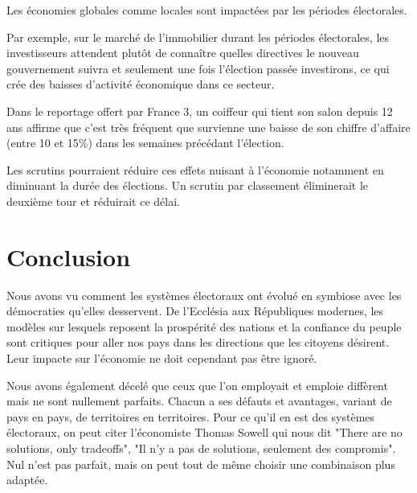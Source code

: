 \documentclass[11pt,a4paper]{report}
\begin{document}
Les économies globales comme locales sont impactées par les périodes électorales.

Par exemple, sur le marché de l’immobilier durant les périodes électorales, les investisseurs attendent plutôt de connaître quelles directives le nouveau gouvernement suivra et seulement une fois l'élection passée investirons, ce qui crée des baisses d’activité économique dans ce secteur.

Dans le reportage offert par France 3\nocite{fr3:impact}, un coiffeur qui tient son salon depuis 12 ans affirme que c’est très fréquent que survienne une baisse de son chiffre d’affaire (entre 10 et 15\%) dans les semaines précédant l'élection.

Les scrutins pourraient réduire ces effets nuisant à l'économie notamment en diminuant la durée des élections. Un scrutin par classement éliminerait le deuxième tour et réduirait ce délai.



\newpage
\section*{Conclusion}
Nous avons vu comment les systèmes électoraux ont évolué en symbiose avec les démocraties qu'elles desservent. De l'Ecclésia aux Républiques modernes, les modèles sur lesquels reposent la prospérité des nations et la confiance du peuple sont critiques pour aller nos pays dans les directions que les citoyens désirent. Leur impacte sur l'économie ne doit cependant pas être ignoré.

Nous avons également décelé que ceux que l'on employait et emploie diffèrent mais ne sont nullement parfaits. Chacun a ses défauts et avantages, variant de pays en pays, de territoires en territoires. Pour ce qu'il en est des systèmes électoraux, on peut citer l'économiste Thomas Sowell qui nous dit "There are no solutions, only tradeoffs", "Il n'y a pas de solutions, seulement des compromis". Nul n'est pas parfait, mais on peut tout de même choisir une combinaison plus adaptée.

 

\end{document}

